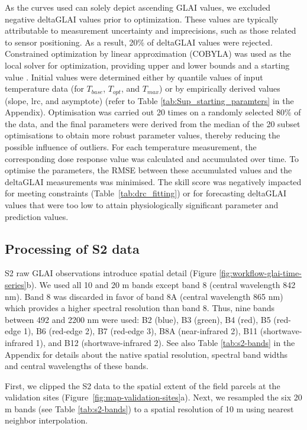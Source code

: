 As the curves used can solely depict ascending \gls{GLAI} values, we excluded negative \gls{deltaGLAI} values prior to optimization. These values are typically attributable to measurement uncertainty and imprecisions, such as those related to sensor positioning. As a result, 20\% of \gls{deltaGLAI} values were rejected. Constrained optimization by linear approximation (COBYLA) was used as the local solver for optimization, providing upper and lower bounds and a starting value \citep{powell_direct_1994}. Initial values were determined either by quantile values of input temperature data (for $T_{base}$, $T_{opt}$, and $T_{max}$) or by empirically derived values (slope, lrc, and asymptote) (refer to Table \ref{tab:Sup_starting_paramters} in the Appendix). Optimisation was carried out 20 times on a randomly selected 80\% of the data, and the final parameters were derived from the median of the 20 subset optimisations to obtain more robust parameter values, thereby reducing the possible influence of outliers. For each temperature measurement, the corresponding dose response value was calculated and accumulated over time. To optimise the parameters, the \gls{RMSE} between these accumulated values and the \gls{deltaGLAI} measurements was minimised. The skill score was negatively impacted for meeting constraints (Table~\ref{tab:drc_fitting}) or for forecasting \gls{deltaGLAI} values that were too low to attain physiologically significant parameter and prediction values.

\subsection{Processing of \gls{S2} data}

\gls{S2} raw \gls{GLAI} observations introduce spatial detail (Figure \ref{fig:workflow-glai-time-series}b).
We used all 10 and 20 m bands except band 8 (central wavelength 842 nm). Band 8 was discarded in favor of band 8A (central wavelength 865 nm) which provides a higher spectral resolution than band 8. Thus, nine bands between 492 and 2200 nm were used: B2 (blue), B3 (green), B4 (red), B5 (red-edge 1), B6 (red-edge 2), B7 (red-edge 3), B8A (near-infrared 2), B11 (shortwave-infrared 1), and B12 (shortwave-infrared 2). See also Table \ref{tab:s2-bands} in the Appendix for details about the native spatial resolution, spectral band widths and central wavelengths of these bands.

First, we clipped the \gls{S2} data to the spatial extent of the field parcels at the validation sites (Figure~\ref{fig:map-validation-sites}a). Next, we resampled the six 20 m bands (see Table \ref{tab:s2-bands}) to a spatial resolution of 10 m using nearest neighbor interpolation.

